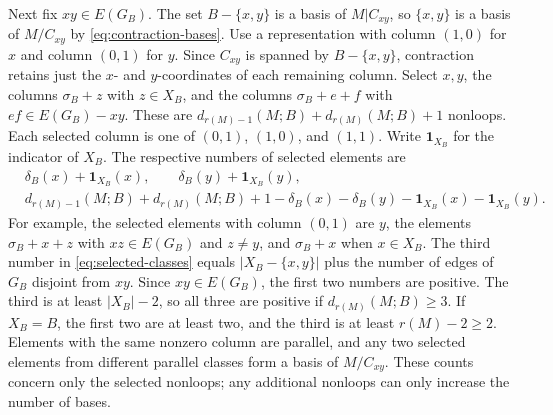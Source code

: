 \documentclass[10pt,a4paper]{article}
\numberwithin{equation}{section}
\newcommand{\dloc}[1]{d_{#1}(M;B)}
\newcommand{\ind}{\mathbf 1}
\begin{document}
Next fix \(xy\in E(G_B)\). The set \(B-\{x,y\}\) is a basis
of \(M|C_{xy}\), so \(\{x,y\}\) is a basis of \(M/C_{xy}\)
by \eqref{eq:contraction-bases}.
Use a representation with column \((1,0)\) for \(x\)
and column \((0,1)\) for \(y\). Since \(C_{xy}\) is spanned
by \(B-\{x,y\}\), contraction retains just the \(x\)- and
\(y\)-coordinates of each remaining column.
Select \(x,y\), the columns \(\sigma_B+z\) with \(z\in X_B\),
and the columns \(\sigma_B+e+f\) with \(ef\in E(G_B)-xy\). These are
\(\dloc{r(M)-1}+\dloc{r(M)}+1\) nonloops. Each selected column is one of
\((0,1)\), \((1,0)\), and \((1,1)\).
Write \(\ind_{X_B}\) for the indicator of \(X_B\).
The respective numbers of selected elements are
\begin{equation}\label{eq:selected-classes}
\begin{split}
 &\delta_B(x)+\ind_{X_B}(x),\qquad
 \delta_B(y)+\ind_{X_B}(y),\\
 &\dloc{r(M)-1}+\dloc{r(M)}+1
 -\delta_B(x)-\delta_B(y)-\ind_{X_B}(x)-\ind_{X_B}(y).
\end{split}
\end{equation}
For example, the selected elements with column \((0,1)\) are \(y\),
the elements \(\sigma_B+x+z\) with \(xz\in E(G_B)\) and \(z\ne y\),
and \(\sigma_B+x\) when \(x\in X_B\).
The third number in \eqref{eq:selected-classes} equals
\(|X_B-\{x,y\}|\) plus the number of edges of \(G_B\) disjoint from \(xy\).
Since \(xy\in E(G_B)\), the first two numbers are positive.
The third is at least \(|X_B|-2\), so all three are positive if
\(\dloc{r(M)}\ge3\). If \(X_B=B\), the first two are at least two,
and the third is at least \(r(M)-2\ge2\).
Elements with the same nonzero column are parallel, and any two
selected elements from different parallel classes form a basis
of \(M/C_{xy}\). These counts concern only the selected
nonloops; any additional nonloops can only increase the number of bases.
\end{document}
